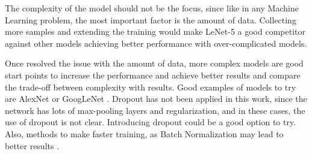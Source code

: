 \documentclass[]{article}
\begin{document}
The complexity of the model should not be the focus, since like in any Machine Learning problem, the most important factor is the amount of data. Collecting more samples and extending the training would make LeNet-5 a good competitor against other models achieving better performance with over-complicated models.

Once resolved the issue with the amount of data, more complex models are good start points to increase the performance and achieve better results and compare the trade-off between complexity with results. Good examples of models to try are AlexNet \cite{Krizhevsky12} or GoogLeNet \cite{Szegedy16}. Dropout has not been applied in this work, since the network has lots of max-pooling layers and regularization, and in these cases, the use of dropout is not clear. Introducing dropout could be a good option to try. Also, methods to make faster training, as Batch Normalization may lead to better results \cite{szegedy15batch}.

%
\end{document}
